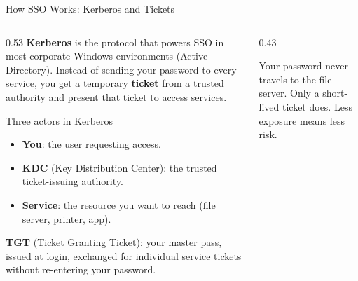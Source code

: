 \documentclass[aspectratio=169]{beamer}  %
\begin{document}
\begin{frame}{How SSO Works: Kerberos and Tickets}
    \begin{columns}[T]
        \begin{column}{0.53\textwidth}
            \footnotesize
            \textbf{Kerberos} is the protocol that powers SSO in most corporate Windows environments (Active Directory). Instead of sending your password to every service, you get a temporary \textbf{ticket} from a trusted authority and present that ticket to access services.

            \vspace{0.4em}
            \begin{block}{Three actors in Kerberos}
                \footnotesize
                \begin{itemize}
                    \item \textbf{You}: the user requesting access.
                    \item \textbf{KDC} (Key Distribution Center): the trusted ticket-issuing authority.
                    \item \textbf{Service}: the resource you want to reach (file server, printer, app).
                \end{itemize}
            \end{block}

            \vspace{0.3em}
            \footnotesize
            \textbf{TGT} (Ticket Granting Ticket): your master pass, issued at login, exchanged for individual service tickets without re-entering your password.
        \end{column}
        \begin{column}{0.43\textwidth}
            \begin{center}
            \end{center}
            \vspace{0.3em}
            \footnotesize
            Your password never travels to the file server. Only a short-lived ticket does. Less exposure means less risk.
        \end{column}
    \end{columns}
\end{frame}
\end{document}
